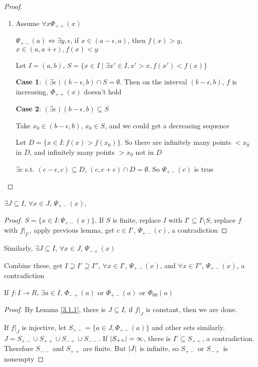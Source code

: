\documentclass[11pt]{article}
\begin{document}
\begin{proof}
\begin{enumerate}
\item Assume \(\forall x\Phi_{++}(x)\)

\(\Psi_{+-}(a)\Leftrightarrow\exists y,\epsilon\), if \(x\in(a-\epsilon,a)\), then \(f(x)>y\), \(x\in (a,a+\epsilon), f(x)<y\)

Let \(I=(a,b)\), \(S=\{x\in I\mid \exists x'\in I, x'>x,f(x')<f(x)\}\)

\textbf{Case 1}: \((\exists \epsilon)(b-\epsilon,b)\cap S=\emptyset\). Then on the interval \((b-\epsilon,b)\), \(f\) is
increasing, \(\Phi_{++}(x)\) doesn't hold

\textbf{Case 2}: \((\exists\epsilon)(b-\epsilon,b)\subseteq S\)

Take \(x_0\in(b-\epsilon,b)\), \(x_0\in S\), and we could get a decreasing sequence

 Let \(D=\{x\in I:f(x)>f(x_0)\}\). So there are infinitely many points \(<x_0\) in \(D\), and
infinitely many points \(>x_0\) not in \(D\)

\(\exists c\) s.t. \((c-\epsilon,c)\subseteq D\), \((c,c+\epsilon)\cap D=\emptyset\). So \(\Psi_{+-}(c)\) is true
\end{enumerate}
\end{proof}

\begin{lemma}[]
\(\exists J\subseteq I\), \(\forall x\in J\), \(\Psi_{+-}(x)\),
\end{lemma}

\begin{proof}
\(S=\{x\in I:\Psi_{+-}(x)\}\). If \(S\) is finite, replace \(I\) with \(I'\subseteq I\setminus S\), replace \(f\)
with \(f|_{I'}\), apply previous lemma, get \(c\in I'\), \(\Psi_{+-}(c)\), a contradiction
\end{proof}

Similarly,     \(\exists J\subseteq I\), \(\forall x\in J\), \(\Psi_{-+}(x)\)

Combine these, get \(I\supseteq I'\supseteq I''\), \(\forall x\in I'\), \(\Psi_{+-}(x)\), and \(\forall x\in I''\), \(\Psi_{+-}(x)\), a contradiction

\begin{lemma}[]
\label{w3.5}
If \(f:I\to R\), \(\exists a\in I\), \(\Phi_{-+}(a)\) or \(\Phi_{+-}(a)\) or \(\Phi_{00}(a)\)
\end{lemma}

\begin{proof}
By Lemma \ref{3.1.1}, there is \(J\subseteq I\), if \(f|_J\) is constant, then we are done.

If \(f|_J\) is injective, let \(S_{+-}=\{a\in J,\Phi_{+-}(a)\}\) and other sets
similarly. \(J=S_{+-}\cup S_{++}\cup S_{-+}\cup S_{--}\). If \(\abs{S_{++}}=\infty\), there
is \(I'\subseteq S_{++}\), a contradiction. Therefore \(S_{--}\) and \(S_{++}\) are finite. But \(\abs{J}\)
is infinite, so \(S_{+-}\) or \(S_{-+}\) is nonempty
\end{proof}
\end{document}
